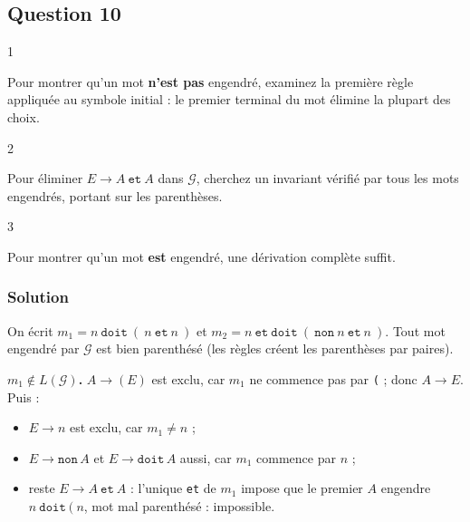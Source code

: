 \documentclass[11pt,a4paper]{article}
\providecommand{\tightlist}{\setlength{\itemsep}{0pt}\setlength{\parskip}{0pt}}
\begin{document}
\hypertarget{question-10}{%
\subsection{Question 10}\label{question-10}}

\begin{indication}{1}

Pour montrer qu'un mot \textbf{n'est pas} engendré, examinez la première règle appliquée au symbole initial : le premier terminal du mot élimine la plupart des choix.

\end{indication}

\begin{indication}{2}

Pour éliminer \(E\to A\ \mathtt{et}\ A\) dans \(\mathcal G\), cherchez un invariant vérifié par tous les mots engendrés, portant sur les parenthèses.

\end{indication}

\begin{indication}{3}

Pour montrer qu'un mot \textbf{est} engendré, une dérivation complète suffit.

\end{indication}

\hypertarget{solution-9}{%
\subsubsection{Solution}\label{solution-9}}

On écrit \(m_1 = n\ \mathtt{doit}\ (\ n\ \mathtt{et}\ n\ )\) et \(m_2 = n\ \mathtt{et}\ \mathtt{doit}\ (\ \mathtt{non}\ n\ \mathtt{et}\ n\ )\). Tout mot engendré par \(\mathcal G\) est bien parenthésé (les règles créent les parenthèses par paires).

\textbf{\(m_1\notin L(\mathcal G)\).} \(A\to(E)\) est exclu, car \(m_1\) ne commence pas par \texttt{(} ; donc \(A\to E\). Puis :

\begin{itemize}
\tightlist
\item
  \(E\to n\) est exclu, car \(m_1\ne n\) ;
\item
  \(E\to\mathtt{non}\,A\) et \(E\to\mathtt{doit}\,A\) aussi, car \(m_1\) commence par \(n\) ;
\item
  reste \(E\to A\ \mathtt{et}\ A\) : l'unique \texttt{et} de \(m_1\) impose que le premier \(A\) engendre \(n\ \mathtt{doit}\ (\ n\), mot mal parenthésé : impossible.
\end{itemize}
\end{document}
